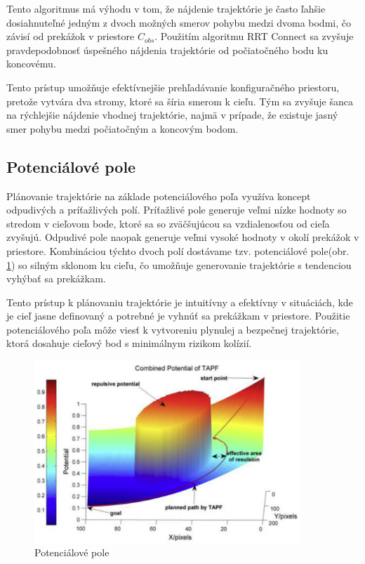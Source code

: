 Tento algoritmus má výhodu v tom, že nájdenie trajektórie je často ľahšie dosiahnuteľné jedným z dvoch možných smerov pohybu medzi dvoma bodmi, čo závisí od prekážok v priestore $C_{obs}$. Použitím algoritmu RRT Connect sa zvyšuje pravdepodobnosť úspešného nájdenia trajektórie od počiatočného bodu ku koncovému.

Tento prístup umožňuje efektívnejšie prehľadávanie konfiguračného priestoru, pretože vytvára dva stromy, ktoré sa šíria smerom k cieľu. Tým sa zvyšuje šanca na rýchlejšie nájdenie vhodnej trajektórie, najmä v prípade, že existuje jasný smer pohybu medzi počiatočným a koncovým bodom.



\subsection{Potenciálové pole}
\label{kap:2.4}

Plánovanie trajektórie na základe potenciálového poľa využíva koncept odpudivých a príťažlivých polí. Príťažlivé pole generuje veľmi nízke hodnoty so stredom v cieľovom bode, ktoré sa so zväčšujúcou sa vzdialenosťou od cieľa zvyšujú. Odpudivé pole naopak generuje veľmi vysoké hodnoty v okolí prekážok v priestore. Kombináciou týchto dvoch polí dostávame tzv. potenciálové pole(obr. \ref{OBRAZOK 1.2.4}) so silným sklonom ku cieľu, čo umožňuje generovanie trajektórie s tendenciou vyhýbať sa prekážkam.

Tento prístup k plánovaniu trajektórie je intuitívny a efektívny v situáciách, kde je cieľ jasne definovaný a potrebné je vyhnúť sa prekážkam v priestore. Použitie potenciálového poľa môže viesť k vytvoreniu plynulej a bezpečnej trajektórie, ktorá dosahuje cieľový bod s minimálnym rizikom kolízií.

\begin{figure}[h]
	\centering
	\includegraphics[width=100mm]{img/Potencialove_pole2.png}
	\caption{Potenciálové pole \cite{Potencialove_pole}}\label{OBRAZOK 1.2.4} 
\end{figure} 

